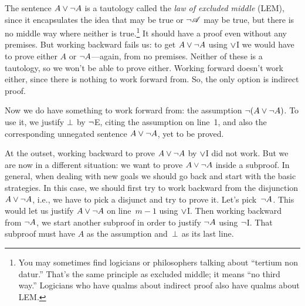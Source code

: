 The sentence $A \vee \neg A$ is a tautology called the \emph{law of
excluded middle} (LEM), since it encapsulates the idea that  may be true or $\neg \mathscr{A}$ may be true, but there is no middle way where neither is true.\footnote{You may sometimes find logicians or philosophers talking about ``tertium non datur.'' That's the same principle as excluded middle; it means ``no third way.'' Logicians who have qualms about indirect proof also have qualms about LEM.} It should have a proof even without any premises. But working backward fails us: to get $A \vee \neg A$ using $\vee$I we would have to prove either $A$ or $\neg A$---again, from no premises. Neither of these is a tautology, so we won't be able to prove either. Working forward doesn't work either, since there is nothing to work forward from. So, the only option is indirect proof.
\begin{fitchproof}
	\open
	\AS
	\ellipsesline
	\close
\end{fitchproof}
Now we do have something to work forward from: the assumption $\neg(A \vee \neg A)$. To use it, we justify $\bot$ by $\neg$E, citing the assumption on line~1, and also the corresponding unnegated sentence $A \vee \neg A$, yet to be proved.
\begin{fitchproof}
	\open
	\AS
	\ellipsesline
	\close
\end{fitchproof}
At the outset, working backward to prove $A \vee\neg A$ by $\vee$I did not work. But we are now in a different situation: we want to prove $A \vee\neg A$ inside a subproof. In general, when dealing with new goals we should go back and start with the basic strategies. In this case, we should first try to work backward from the disjunction $A \vee \neg A$, i.e., we have to pick a disjunct and try to prove it. Let's pick~$\neg A$. This would let us justify $A \vee \neg A$ on line~$m - 1$ using $\vee$I. Then working backward from $\neg A$, we start another subproof in order to justify $\neg A$ using $\neg$I. That subproof must have $A$ as the assumption and~$\bot$ as its last line.
\begin{fitchproof}
	\open
	\AS
	\open
	\AS
	\ellipsesline
	\close
	\close
\end{fitchproof}
